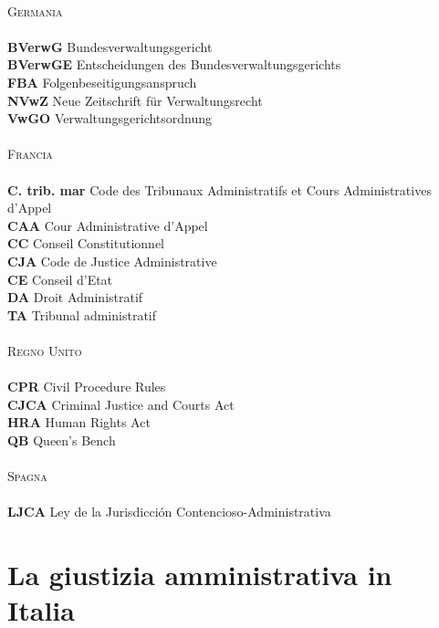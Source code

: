 \documentclass[12pt,it,a4paper,]{report}
\begin{document}
\begin{tabbing}
 \> \\
\textsc{Germania} \> \\
 \> \\
\textbf{BVerwG} \> Bundesverwaltungsgericht \\
\textbf{BVerwGE} \> Entscheidungen des Bundesverwaltungsgerichts \\
\textbf{FBA} \> Folgenbeseitigungsanspruch \\
\textbf{NVwZ} \> Neue Zeitschrift für Verwaltungsrecht \\
\textbf{VwGO} \> Verwaltungsgerichtsordnung \\
 \> \\
\textsc{Francia} \> \\
 \> \\
\textbf{C. trib. mar} \> Code des Tribunaux Administratifs et Cours Administratives d’Appel \\
\textbf{CAA} \> Cour Administrative d'Appel \\
\textbf{CC} \> Conseil Constitutionnel \\
\textbf{CJA} \> Code de Justice Administrative \\
\textbf{CE} \> Conseil d'Etat \\
\textbf{DA} \> Droit Administratif \\
\textbf{TA} \> Tribunal administratif \\
 \> \\
\textsc{Regno Unito} \> \\
 \> \\
\textbf{CPR} \> Civil Procedure Rules \\
\textbf{CJCA} \> Criminal Justice and Courts Act \\
\textbf{HRA} \> Human Rights Act \\
\textbf{QB} \> Queen's Bench \\
 \> \\
\textsc{Spagna} \> \\
 \> \\
\textbf{LJCA} \> Ley de la Jurisdicción Contencioso-Administrativa \\

\end{tabbing}
\newpage

\setcounter{page}{1}
\doublespacing
\setlength{\parindent}{0.5in}

\hypertarget{la-giustizia-amministrativa-in-italia}{%
\chapter{La giustizia amministrativa in
Italia}\label{la-giustizia-amministrativa-in-italia}}
\end{document}
